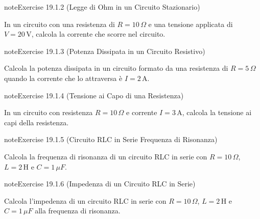 \documentclass[letterpaper,10pt,italian]{jupyterBook}
\begin{document}
\begin{sphinxadmonition}{note}{Exercise 19.1.2 (Legge di Ohm in un Circuito Stazionario)}



\sphinxAtStartPar
In un circuito con una resistenza di \(R = 10 \, \Omega\) e una tensione applicata di \(V = 20 \, \text{V}\), calcola la corrente che scorre nel circuito.
\end{sphinxadmonition}
 \label{exercise:ch/electromagnetism/circuits-electric-problems-exercise-2}

\begin{sphinxadmonition}{note}{Exercise 19.1.3 (Potenza Dissipata in un Circuito Resistivo)}



\sphinxAtStartPar
Calcola la potenza dissipata in un circuito formato da una resistenza di \(R = 5 \, \Omega\) quando la corrente che lo attraversa è \(I = 2 \, \text{A}\).
\end{sphinxadmonition}
 \label{exercise:ch/electromagnetism/circuits-electric-problems-exercise-3}

\begin{sphinxadmonition}{note}{Exercise 19.1.4 (Tensione ai Capo di una Resistenza)}



\sphinxAtStartPar
In un circuito con resistenza \(R = 10 \, \Omega\) e corrente \(I = 3 \, \text{A}\), calcola la tensione ai capi della resistenza.
\end{sphinxadmonition}
 \label{exercise:ch/electromagnetism/circuits-electric-problems-exercise-4}

\begin{sphinxadmonition}{note}{Exercise 19.1.5 (Circuito RLC in Serie \sphinxhyphen{} Frequenza di Risonanza)}



\sphinxAtStartPar
Calcola la frequenza di risonanza di un circuito RLC in serie con \(R = 10 \, \Omega\), \(L = 2 \, \text{H}\) e \(C = 1 \, \mu F\).
\end{sphinxadmonition}
 \label{exercise:ch/electromagnetism/circuits-electric-problems-exercise-5}

\begin{sphinxadmonition}{note}{Exercise 19.1.6 (Impedenza di un Circuito RLC in Serie)}



\sphinxAtStartPar
Calcola l’impedenza di un circuito RLC in serie con \(R = 10 \, \Omega\), \(L = 2 \, \text{H}\) e \(C = 1 \, \mu F\) alla frequenza di risonanza.
\end{sphinxadmonition}
 \label{exercise:ch/electromagnetism/circuits-electric-problems-exercise-6}
\end{document}
